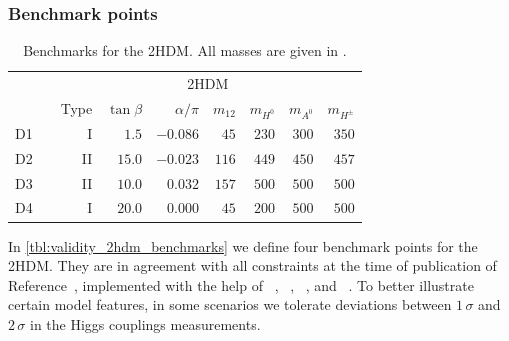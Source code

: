 \subsubsection{Benchmark points}

\begin{table} 
  \begin{tabular}{c c rrrrrrr }
    \toprule
    \multirow{2}{*}{} && \multicolumn{7}{c}{2HDM} \\
    \cmidrule{3-9}
    && Type & $\tan\beta$ & $\alpha/\pi$
    & $m_{12} $ & $m_{H^0} $ & $m_{A^0} $ & $m_{H^\pm}$ \\
    \midrule
    D1 && I & $1.5$ & $-0.086$ & $45$ & $230$ & $300$ & $350$ \\
    D2 && II & $15.0$ & $-0.023$ & $116$ & $449$ & $450$ & $457$ \\
    D3 && II & $10.0$ & $0.032$ & $157$ & $500$ & $500$ & $500$ \\
    D4 && I & $20.0$ & $0.000$ & $45$ & $200$ & $500$ & $500$ \\
    \bottomrule
  \end{tabular}
  \caption[Benchmarks for the 2HDM model]{Benchmarks
    for the 2HDM. All masses are given in \gev.}
 \label{tbl:validity_2hdm_benchmarks}
\end{table}

In \autoref{tbl:validity_2hdm_benchmarks} we define four benchmark
points for the 2HDM. They are in agreement with all constraints at the
time of publication of Reference~\cite{Brehmer:2015rna}, implemented with
the help of ~\cite{Eriksson:2009ws},
~\cite{Bechtle:2008jh, Bechtle:2011sb},
~\cite{Mahmoudi:2008tp}, and
~\cite{Bechtle:2013xfa}. To better illustrate
certain model features, in some scenarios we tolerate deviations
between $1\,\sigma$ and $2\,\sigma$ in the Higgs couplings
measurements.

